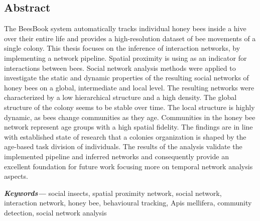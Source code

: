 %
\pagestyle{empty}
\providecommand{\keywords}[1]{\textbf{\textit{Keywords---}} #1}

\subsection*{Abstract}
The BeesBook system automatically tracks individual honey bees inside a hive over their entire life and provides a high-resolution dataset of bee movements of a single colony.
This thesis focuses on the inference of interaction networks, by implementing a network pipeline.
Spatial proximity is using as an indicator for interactions between bees.
Social network analysis methods were applied to investigate the static and dynamic properties of the resulting social networks of honey bees on a global, intermediate and local level.
The resulting networks were characterized by a low hierarchical structure and a high density.
The global structure of the colony seems to be stable over time.
The local structure is highly dynamic, as bees change communities as they age.
Communities in the honey bee network represent age groups with a high spatial fidelity.
The findings are in line with established state of research that a colonies organization is shaped by the age-based task division of individuals.
The results of the analysis validate the implemented pipeline and inferred networks and consequently provide an excellent foundation for future work focusing more on temporal network analysis aspects.

\vspace{5mm}
\keywords{social insects, spatial proximity network, social network, interaction network, honey bee, behavioural tracking, Apis mellifera, community detection, social network analysis}

\cleardoublepage
